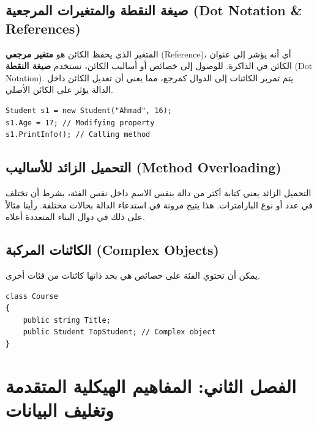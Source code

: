 \documentclass[14pt]{extarticle}
\begin{document}
\subsection{صيغة النقطة والمتغيرات المرجعية (\textenglish{Dot Notation \& References})}
المتغير الذي يحفظ الكائن هو \textbf{متغير مرجعي} (\textenglish{Reference})، أي أنه يؤشر إلى عنوان الكائن في الذاكرة. للوصول إلى خصائص أو أساليب الكائن، نستخدم \textbf{صيغة النقطة} (\textenglish{Dot Notation}). يتم تمرير الكائنات إلى الدوال كمرجع، مما يعني أن تعديل الكائن داخل الدالة يؤثر على الكائن الأصلي.

\begin{boxExample}
\begin{english}
\begin{verbatim}
Student s1 = new Student("Ahmad", 16);
s1.Age = 17; // Modifying property
s1.PrintInfo(); // Calling method
\end{verbatim}
\end{english}
\end{boxExample}

\subsection{التحميل الزائد للأساليب (\textenglish{Method Overloading})}
التحميل الزائد يعني كتابة أكثر من دالة بنفس الاسم داخل نفس الفئة، بشرط أن تختلف في عدد أو نوع البارامترات. هذا يتيح مرونة في استدعاء الدالة بحالات مختلفة. رأينا مثالاً على ذلك في دوال البناء المتعددة أعلاه.

\subsection{الكائنات المركبة (\textenglish{Complex Objects})}
يمكن أن تحتوي الفئة على خصائص هي بحد ذاتها كائنات من فئات أخرى.
\begin{boxExample}
\begin{english}
\begin{verbatim}
class Course
{
    public string Title;
    public Student TopStudent; // Complex object
}
\end{verbatim}
\end{english}
\end{boxExample}

\clearpage
\section{الفصل الثاني: المفاهيم الهيكلية المتقدمة وتغليف البيانات}
\end{document}
